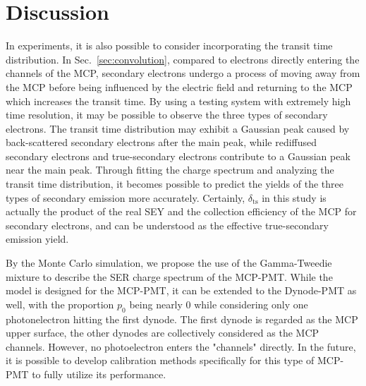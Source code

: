 \section{Discussion}\label{sec:discussion}
In experiments, it is also possible to consider incorporating the transit time distribution.
In Sec.~\ref{sec:convolution}, compared to electrons directly entering the channels of the MCP,
secondary electrons undergo a process of moving away from the MCP
before being influenced by the electric field and returning to the MCP
which increases the transit time.
By using a testing system with extremely high time resolution,
it may be possible to observe the three types of secondary electrons.
The transit time distribution may exhibit a Gaussian peak caused by back-scattered secondary electrons after the main peak,
while rediffused secondary electrons and true-secondary electrons contribute to a Gaussian peak near the main peak.
Through fitting the charge spectrum and analyzing the transit time distribution,
it becomes possible to predict the yields of the three types of secondary emission more accurately.
Certainly, $\delta_{\mathrm{ts}}$ in this study is actually the product
of the real SEY and the collection efficiency of the MCP for secondary electrons,
and can be understood as the effective true-secondary emission yield.

By the Monte Carlo simulation,
we propose the use of the Gamma-Tweedie mixture to describe the SER charge spectrum of the MCP-PMT.
While the model is designed for the MCP-PMT, it can be extended to the Dynode-PMT as well,
with the proportion $p_0$ being nearly 0
while considering only one photonelectron hitting the first dynode.
The first dynode is regarded as the MCP upper surface,
the other dynodes are collectively considered as the MCP channels.
However, no photoelectron enters the "channels" directly.
In the future, it is possible to develop calibration methods specifically for this type of MCP-PMT
to fully utilize its performance.
